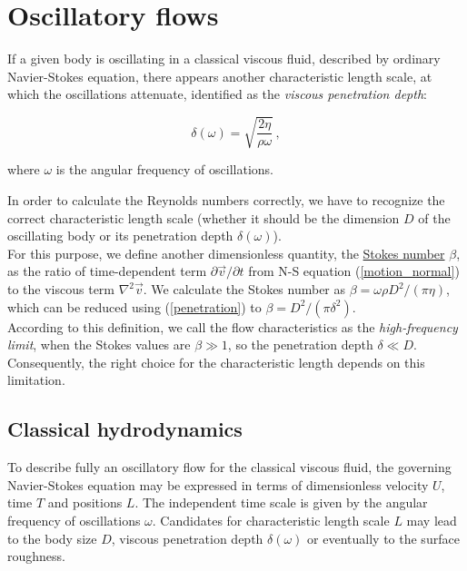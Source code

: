 
\section{Oscillatory flows}

If a given body is oscillating in a classical viscous fluid, described by ordinary Navier-Stokes equation, there appears another characteristic length scale, at which the oscillations attenuate, identified \cite{landau} \cite{bakalaris} as the \textit{viscous penetration depth}:

\begin{equation}
\delta(\omega) = \sqrt{\frac{2\eta}{\rho\omega}}\,,
\label{penetration}
\end{equation}

where $\omega$ is the angular frequency of oscillations.

In order to calculate the Reynolds numbers correctly, we have to recognize the correct characteristic length scale (whether it should be the dimension $D$ of the oscillating body or its penetration depth $\delta(\omega)$).\\
For this purpose, we define another dimensionless quantity, the \underline{Stokes number} $\beta$, as the ratio of time-dependent term $\partial \vec{v} / \partial t$ from N-S equation (\ref{motion_normal}) to the viscous term $\nabla^2 \vec{v}$.
We calculate the Stokes number \cite{stokes} as $\beta = \omega \rho D^2 / (\pi \eta)$, which can be reduced using (\ref{penetration}) to $\beta = D^2 / (\pi \delta^2)$.\\
According to this definition, we call the flow characteristics as the \textit{high-frequency limit}, when the Stokes values are $\beta \gg 1$, so the penetration depth $\delta \ll D$. Consequently, the right choice for the characteristic length depends on this limitation.


\subsection*{Classical hydrodynamics}

To describe fully an oscillatory flow for the classical viscous fluid, the governing Navier-Stokes equation may be expressed in terms of dimensionless velocity $U$, time $T$ and positions $L$. The independent time scale is given by the angular frequency of oscillations $\omega$. Candidates for characteristic length scale $L$ may lead to the body size $D$, viscous penetration depth $\delta(\omega)$ or eventually to the surface roughness.

